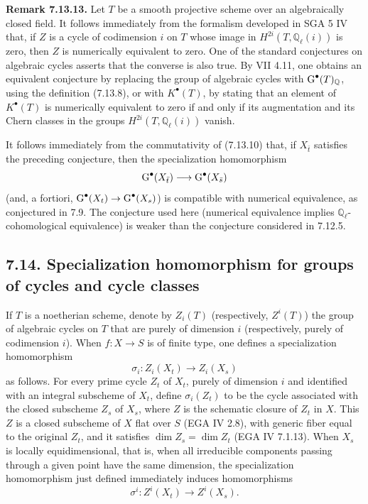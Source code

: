 \textbf{Remark 7.13.13.}
Let $T$ be a smooth projective scheme over an algebraically closed field. It
follows immediately from the formalism developed in SGA 5 IV that, if $Z$ is
a cycle of codimension $i$ on $T$ whose image in
$H^{2i}(T,\mathbb Q_\ell(i))$ is zero, then $Z$ is numerically equivalent to
zero. One of the standard conjectures on algebraic cycles asserts that the
converse is also true. By VII 4.11, one obtains an equivalent conjecture by
replacing the group of algebraic cycles with $\operatorname{G}^\bullet(T)_{\mathbb Q}$,
using the definition (7.13.8), or with $K^\bullet(T)$, by stating that an
element of $K^\bullet(T)$ is numerically equivalent to zero if and only if
its augmentation and its Chern classes in the groups
$H^{2i}(T,\mathbb Q_\ell(i))$ vanish.

It follows immediately from the commutativity of (7.13.10) that, if
$X_{\bar t}$ satisfies the preceding conjecture, then the specialization
homomorphism
\[
\operatorname{G}^\bullet(X_{\bar t})\longrightarrow\operatorname{G}^\bullet(X_{\bar s})
\]
(and, a fortiori, $\operatorname{G}^\bullet(X_t)\to\operatorname{G}^\bullet(X_s)$) is compatible with
numerical equivalence, as conjectured in 7.9. The conjecture used here
(numerical equivalence implies $\mathbb Q_\ell$-cohomological equivalence) is
weaker than the conjecture considered in 7.12.5.

\subsection*{7.14. Specialization homomorphism for groups of cycles and cycle classes}
If $T$ is a noetherian scheme, denote by $Z_i(T)$ (respectively, $Z^i(T)$)
the group of algebraic cycles on $T$ that are purely of dimension $i$
(respectively, purely of codimension $i$). When $f:X\to S$ is of finite type,
one defines
a specialization homomorphism
\begin{equation}\tag{7.14.1}
\sigma_i:Z_i(X_t)\longrightarrow Z_i(X_s)
\end{equation}
as follows. For every prime cycle $Z_t$ of $X_t$, purely of dimension $i$ and
identified with an integral subscheme of $X_t$, define $\sigma_i(Z_t)$ to be
the cycle associated with the closed subscheme $Z_s$ of $X_s$, where $Z$ is
the schematic closure of $Z_t$ in $X$. This $Z$ is a closed subscheme of $X$
flat over $S$ (EGA IV 2.8), with generic fiber equal to the original $Z_t$,
and it satisfies $\dim Z_s=\dim Z_t$ (EGA IV 7.1.13). When $X_s$ is locally
equidimensional, that is, when all irreducible components passing through a
given point have the same dimension, the specialization homomorphism just
defined immediately induces homomorphisms
\begin{equation}\tag{7.14.1 bis}
\sigma^i:Z^i(X_t)\longrightarrow Z^i(X_s).
\end{equation}

